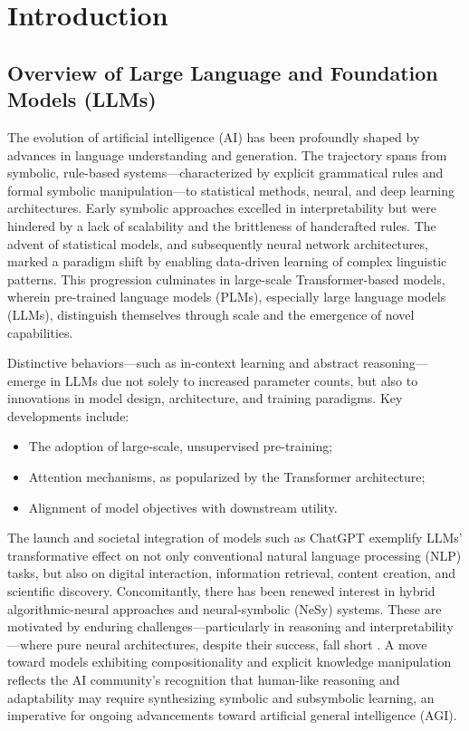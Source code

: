 \documentclass[sigconf]{acmart}
\begin{document}
\section{Introduction}

\subsection{Overview of Large Language and Foundation Models (LLMs)}

The evolution of artificial intelligence (AI) has been profoundly shaped by advances in language understanding and generation. The trajectory spans from symbolic, rule-based systems—characterized by explicit grammatical rules and formal symbolic manipulation—to statistical methods, neural, and deep learning architectures. Early symbolic approaches excelled in interpretability but were hindered by a lack of scalability and the brittleness of handcrafted rules. The advent of statistical models, and subsequently neural network architectures, marked a paradigm shift by enabling data-driven learning of complex linguistic patterns. This progression culminates in large-scale Transformer-based models, wherein pre-trained language models (PLMs), especially large language models (LLMs), distinguish themselves through scale and the emergence of novel capabilities.

Distinctive behaviors—such as in-context learning and abstract reasoning—emerge in LLMs due not solely to increased parameter counts, but also to innovations in model design, architecture, and training paradigms. Key developments include:

\begin{itemize}
    \item The adoption of large-scale, unsupervised pre-training;
    \item Attention mechanisms, as popularized by the Transformer architecture;
    \item Alignment of model objectives with downstream utility.
\end{itemize}

The launch and societal integration of models such as ChatGPT exemplify LLMs' transformative effect on not only conventional natural language processing (NLP) tasks, but also on digital interaction, information retrieval, content creation, and scientific discovery. Concomitantly, there has been renewed interest in hybrid algorithmic-neural approaches and neural-symbolic (NeSy) systems. These are motivated by enduring challenges—particularly in reasoning and interpretability—where pure neural architectures, despite their success, fall short \cite{ref42,ref49,ref54,ref86}. A move toward models exhibiting compositionality and explicit knowledge manipulation reflects the AI community’s recognition that human-like reasoning and adaptability may require synthesizing symbolic and subsymbolic learning, an imperative for ongoing advancements toward artificial general intelligence (AGI).
\end{document}
